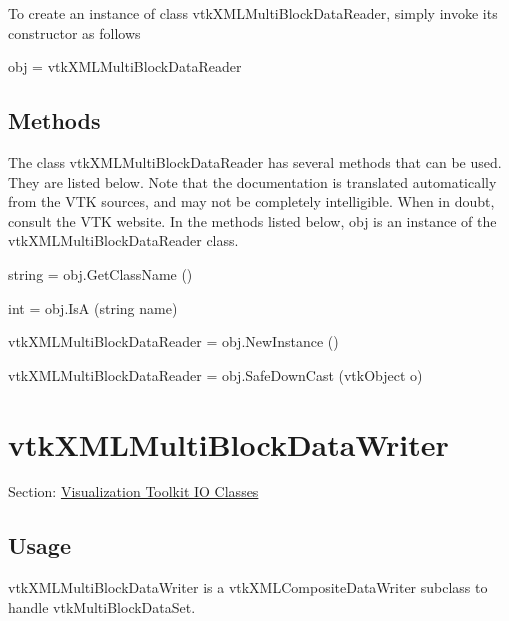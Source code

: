 To create an instance of class vtk\-X\-M\-L\-Multi\-Block\-Data\-Reader, simply invoke its constructor as follows \begin{DoxyVerb}  obj = vtkXMLMultiBlockDataReader
\end{DoxyVerb}
 \hypertarget{vtkwidgets_vtkxyplotwidget_Methods}{}\subsection{Methods}\label{vtkwidgets_vtkxyplotwidget_Methods}
The class vtk\-X\-M\-L\-Multi\-Block\-Data\-Reader has several methods that can be used. They are listed below. Note that the documentation is translated automatically from the V\-T\-K sources, and may not be completely intelligible. When in doubt, consult the V\-T\-K website. In the methods listed below, {\ttfamily obj} is an instance of the vtk\-X\-M\-L\-Multi\-Block\-Data\-Reader class. 
\begin{DoxyItemize}
\item {\ttfamily string = obj.\-Get\-Class\-Name ()}  
\item {\ttfamily int = obj.\-Is\-A (string name)}  
\item {\ttfamily vtk\-X\-M\-L\-Multi\-Block\-Data\-Reader = obj.\-New\-Instance ()}  
\item {\ttfamily vtk\-X\-M\-L\-Multi\-Block\-Data\-Reader = obj.\-Safe\-Down\-Cast (vtk\-Object o)}  
\end{DoxyItemize}\hypertarget{vtkio_vtkxmlmultiblockdatawriter}{}\section{vtk\-X\-M\-L\-Multi\-Block\-Data\-Writer}\label{vtkio_vtkxmlmultiblockdatawriter}
Section\-: \hyperlink{sec_vtkio}{Visualization Toolkit I\-O Classes} \hypertarget{vtkwidgets_vtkxyplotwidget_Usage}{}\subsection{Usage}\label{vtkwidgets_vtkxyplotwidget_Usage}
vtk\-X\-M\-L\-Multi\-Block\-Data\-Writer is a vtk\-X\-M\-L\-Composite\-Data\-Writer subclass to handle vtk\-Multi\-Block\-Data\-Set.

